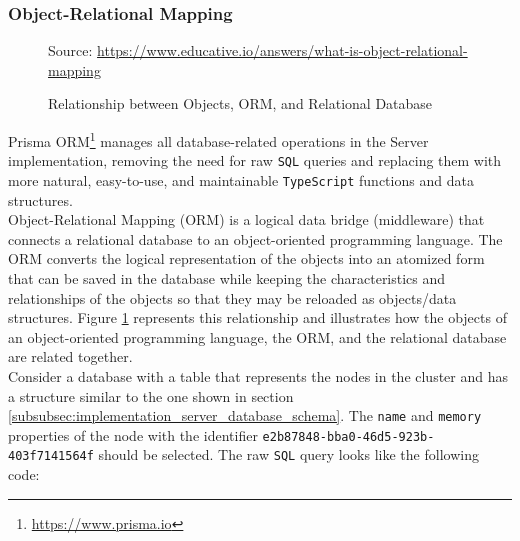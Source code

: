 \subsubsection{Object-Relational Mapping}
\label{subsubsec:implementation_server_database_object_relational_mapping}

\begin{figure} %
  \centering
  \def\stackalignment{l} %
  {\scriptsize \parbox[t]{\linewidth}{ Source: \url{https://www.educative.io/answers/what-is-object-relational-mapping}} }
  \caption{Relationship between Objects, ORM, and Relational Database}
  \label{fig:orm}
\end{figure}

Prisma ORM\footnote{\url{https://www.prisma.io}} manages all database-related operations
in the Server implementation, removing the need for raw \texttt{SQL} queries and
replacing them with more natural, easy-to-use, and maintainable \texttt{TypeScript}
functions and data structures. \\ %
Object-Relational Mapping (ORM) is a logical data bridge (middleware) that
connects a relational database to an object-oriented programming language. The ORM
converts the logical representation of the objects into an atomized form that can
be saved in the database while keeping the characteristics and relationships of the
objects so that they may be reloaded as objects/data structures\cite{orm}. Figure
\ref{fig:orm} represents this relationship and illustrates how the objects of an
object-oriented programming language, the ORM, and the relational database are related
together. \\ %
Consider a database with a table that represents the nodes in the cluster and has
a structure similar to the one shown in section \ref{subsubsec:implementation_server_database_schema}.
The \texttt{name} and \texttt{memory} properties of the node with the identifier
\texttt{e2b87848-bba0-46d5-923b-403f7141564f} should be selected. The raw
\texttt{SQL} query looks like the following code:

